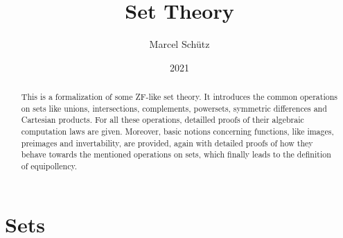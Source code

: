 \documentclass{article}
\title{Set Theory}
\author{Marcel Schütz}
\date{2021}
\begin{document}
  \maketitle

  \begin{abstract}
    This is a formalization of some ZF-like set theory.
    It introduces the common operations on sets like unions, intersections,
    complements, powersets, symmetric differences and Cartesian products.
    For all these operations, detailled proofs of their algebraic computation
    laws are given.
    Moreover, basic notions concerning functions, like images, preimages and
    invertability, are provided, again with detailed proofs of how they behave
    towards the mentioned operations on sets, which finally leads to the
    definition of equipollency.
  \end{abstract}

  \tableofcontents

  \newpage
  \part{Sets}

  
  \begin{comment}
    \begin{forthel}
      [readtex \path{set-theory/sections/01_sets/01_sets.ftl.tex}]
    \end{forthel}
  \end{comment}

  \newpage
  
  \begin{comment}
    \begin{forthel}
      [readtex \path{set-theory/sections/01_sets/02_powerset.ftl.tex}]
    \end{forthel}
  \end{comment}

  \newpage
  
  \begin{comment}
    \begin{forthel}
      [readtex \path{set-theory/sections/01_sets/03_regularity.ftl.tex}]
    \end{forthel}
  \end{comment}

  \newpage
  
  \begin{comment}
    \begin{forthel}
      [readtex \path{set-theory/sections/01_sets/04_symmetric-difference.ftl.tex}]
    \end{forthel}
  \end{comment}
\end{document}
